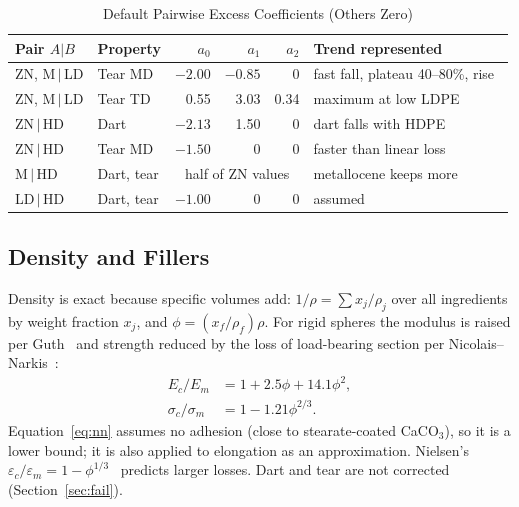 \documentclass[conference,a4paper]{IEEEtran}
\begin{document}
\begin{table}[!t]
\caption{Default Pairwise Excess Coefficients (Others Zero)}
\label{tab:excess}\centering\footnotesize\setlength{\tabcolsep}{3pt}
\begin{tabular}{llrrr>{\raggedright\arraybackslash}p{2.5cm}}
\toprule
Pair $A|B$ & Property & $a_0$ & $a_1$ & $a_2$ & Trend represented \\
\midrule
ZN, M\,$|$\,LD & Tear MD & $-2.00$ & $-0.85$ & 0 & fast fall, plateau 40--80\%, rise~\cite{savar} \\
ZN, M\,$|$\,LD & Tear TD & 0.55 & 3.03 & 0.34 & maximum at low LDPE~\cite{savar} \\
ZN\,$|$\,HD & Dart & $-2.13$ & 1.50 & 0 & dart falls with HDPE~\cite{elkoun,us6355733} \\
ZN\,$|$\,HD & Tear MD & $-1.50$ & 0 & 0 & faster than linear loss~\cite{elkoun} \\
M\,$|$\,HD & Dart, tear & \multicolumn{3}{c}{half of ZN values} & metallocene keeps more~\cite{us12152135} \\
LD\,$|$\,HD & Dart, tear & $-1.00$ & 0 & 0 & assumed \\
\bottomrule
\end{tabular}
\end{table}

\subsection{Density and Fillers}
Density is exact because specific volumes add: $1/\rho=\sum x_j/\rho_j$ over all ingredients by weight fraction $x_j$, and $\phi=(x_f/\rho_f)\rho$. For rigid spheres the modulus is raised per Guth~\cite{guth} and strength reduced by the loss of load-bearing section per Nicolais--Narkis~\cite{nicolais,turcsanyi}:
\begin{align}
E_c/E_m&=1+2.5\phi+14.1\phi^2, \label{eq:guth}\\
\sigma_c/\sigma_m&=1-1.21\phi^{2/3}. \label{eq:nn}
\end{align}
Equation~\eqref{eq:nn} assumes no adhesion (close to stearate-coated CaCO$_3$), so it is a lower bound; it is also applied to elongation as an approximation. Nielsen's $\varepsilon_c/\varepsilon_m=1-\phi^{1/3}$~\cite{nielsen} predicts larger losses. Dart and tear are not corrected (Section~\ref{sec:fail}).
\end{document}
